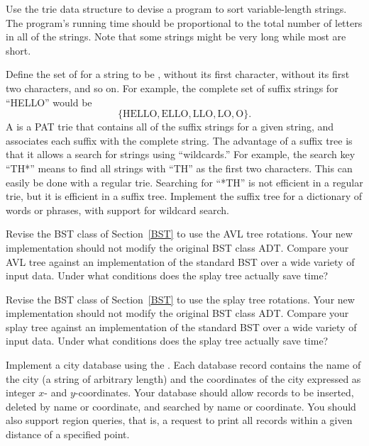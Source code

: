 \begin{projects}

\item
Use the trie data structure to devise a program to sort
variable-length strings.
The program's running time should be proportional to the total
number of letters in all of the strings.
Note that some strings might be very long while most are short.

\item
Define the set of  for a string  to be
,  without its first character,  without its
first two characters, and so on.
For example, the complete set of suffix strings for ``HELLO'' would be
\[\{ \mbox{HELLO}, \mbox{ELLO}, \mbox{LLO}, \mbox{LO}, \mbox{O} \}.\]
A  is a PAT trie that contains all of the suffix
strings for a given string, and associates each suffix with the
complete string.
The advantage of a suffix tree is that it allows a search for strings
using ``wildcards.''
For example, the search key ``TH*'' means to find all strings
with ``TH'' as the first two characters.
This can easily be done with a regular trie.
Searching for ``*TH'' is not efficient in a regular trie, but it is
efficient in a suffix tree.
Implement the suffix tree for a dictionary of words or phrases, with
support for wildcard search.

\item
Revise the BST class of Section~\ref{BST} to use the AVL tree
rotations.
Your new implementation should not modify the original BST class
ADT.
Compare your AVL tree against an implementation of the standard BST
over a wide variety of input data.
Under what conditions does the splay tree actually save time?

\item
Revise the BST class of Section~\ref{BST} to use the splay tree
rotations.
Your new implementation should not modify the original BST class
ADT.
Compare your splay tree against an implementation of the standard BST
over a wide variety of input data.
Under what conditions does the splay tree actually save time?

\item
Implement a city database using the
\KDtree.
Each database record contains the name of the city (a string of
arbitrary length) and the coordinates of the city expressed as integer
$x$- and $y$-coordinates.
Your database should allow records to be inserted, deleted by name or
coordinate, and searched by name or coordinate.
You should also support region queries, that is, a request to print
all records within a given distance of a specified point.


\end{projects}
